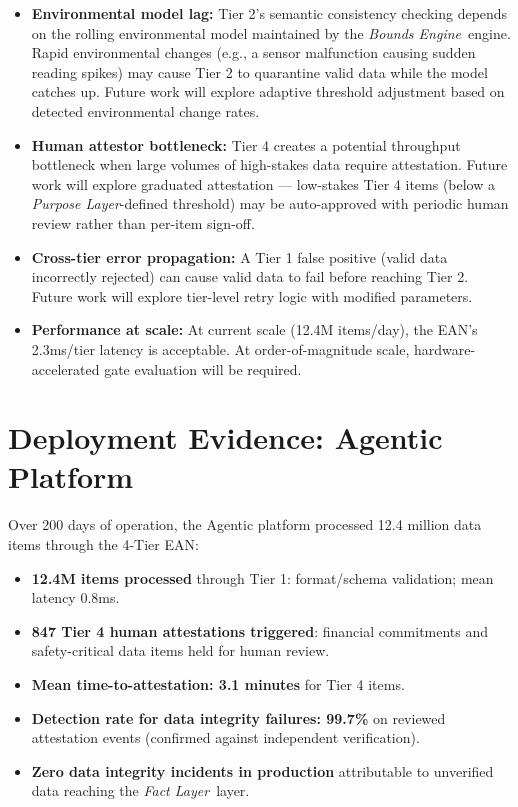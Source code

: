 \documentclass[12pt]{article}
\newcommand{\purpose}{\textit{Purpose Layer}}
\newcommand{\bounds}{\textit{Bounds Engine}}
\newcommand{\fact}{\textit{Fact Layer}}
\begin{document}
\begin{itemize}
    \item \textbf{Environmental model lag:} Tier 2's semantic consistency checking depends on the rolling environmental model maintained by the \bounds\ engine. Rapid environmental changes (e.g., a sensor malfunction causing sudden reading spikes) may cause Tier 2 to quarantine valid data while the model catches up. Future work will explore adaptive threshold adjustment based on detected environmental change rates.
    \item \textbf{Human attestor bottleneck:} Tier 4 creates a potential throughput bottleneck when large volumes of high-stakes data require attestation. Future work will explore graduated attestation — low-stakes Tier 4 items (below a \purpose-defined threshold) may be auto-approved with periodic human review rather than per-item sign-off.
    \item \textbf{Cross-tier error propagation:} A Tier 1 false positive (valid data incorrectly rejected) can cause valid data to fail before reaching Tier 2. Future work will explore tier-level retry logic with modified parameters.
    \item \textbf{Performance at scale:} At current scale (12.4M items/day), the EAN's 2.3ms/tier latency is acceptable. At order-of-magnitude scale, hardware-accelerated gate evaluation will be required.
\end{itemize}

\section{Deployment Evidence: Agentic Platform}
\label{sec:deployment}

Over 200 days of operation, the Agentic platform processed 12.4 million data items through the 4-Tier EAN:

\begin{itemize}[noitemsep]
    \item \textbf{12.4M items processed} through Tier 1: format/schema validation; mean latency 0.8ms.
    \item \textbf{847 Tier 4 human attestations triggered}: financial commitments and safety-critical data items held for human review.
    \item \textbf{Mean time-to-attestation: 3.1 minutes} for Tier 4 items.
    \item \textbf{Detection rate for data integrity failures: 99.7\%} on reviewed attestation events (confirmed against independent verification).
    \item \textbf{Zero data integrity incidents in production} attributable to unverified data reaching the \fact\ layer.
\end{itemize}
\end{document}
